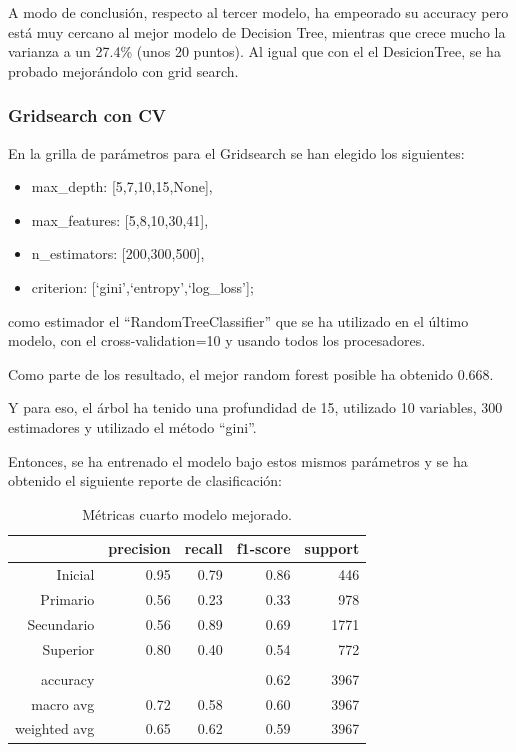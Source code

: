 \documentclass[a4paper]{article}
\begin{document}
            A modo de conclusión, respecto al tercer modelo, ha empeorado su accuracy pero está muy cercano al mejor modelo de Decision Tree, mientras que crece mucho la varianza a un 27.4\% (unos 20 puntos). 
            Al igual que con el el DesicionTree, se ha probado mejorándolo con grid search.

        \subsubsection{Gridsearch con CV}

            En la grilla de parámetros para el Gridsearch se han elegido los siguientes:
            \begin{itemize}
                \item max\_depth: [5,7,10,15,None],
                \item max\_features: [5,8,10,30,41],
                \item n\_estimators: [200,300,500],
                \item criterion: [`gini',`entropy',`log\_loss'];
            \end{itemize}
            como estimador el ``RandomTreeClassifier'' que se ha utilizado en el último modelo, con el cross-validation=10 y  usando todos los procesadores.

           Como parte de los resultado, el mejor random forest posible ha obtenido 0.668. 

            Y para eso, el árbol ha tenido una profundidad de 15, utilizado  10  variables,  300  estimadores y utilizado el método ``gini''.
            
            Entonces, se ha entrenado el modelo bajo estos mismos parámetros y se ha obtenido el siguiente reporte de clasificación:

            \begin{table}[!ht]
                \centering
                \begin{tabular}{rrrrr}
                    \toprule
                    ~ & precision & recall & f1-score & support \\ \midrule
                    Inicial    & 0.95 & 0.79 & 0.86 & 446 \\
                    Primario   & 0.56 & 0.23 & 0.33 & 978 \\
                    Secundario & 0.56 & 0.89 & 0.69 & 1771 \\
                    Superior   & 0.80 & 0.40 & 0.54 & 772 \\
                    & & & & \\
                    accuracy & & & 0.62 & 3967 \\
                    macro avg & 0.72 & 0.58 & 0.60 & 3967 \\
                    weighted avg & 0.65 & 0.62 & 0.59 & 3967 \\
                    \bottomrule
                \end{tabular}
                \caption{Métricas cuarto modelo mejorado.}
                \label{New fourth model metrics}
            \end{table}
            
\end{document}
